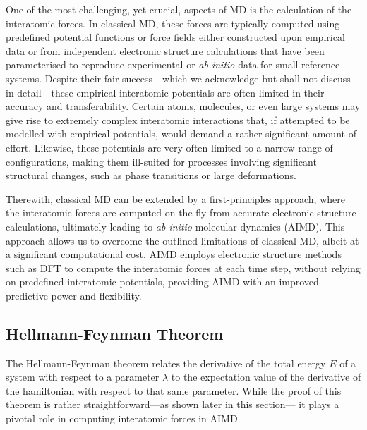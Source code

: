 One of the most challenging, yet crucial, aspects of MD is the calculation of the interatomic forces. In classical MD, these forces are typically computed using predefined potential functions or force fields either constructed upon empirical data or from independent electronic structure calculations that have been parameterised to reproduce experimental or \emph{ab initio} data for small reference systems. Despite their fair success---which we acknowledge but shall not discuss in detail---these empirical interatomic potentials are often limited in their accuracy and transferability. Certain atoms, molecules, or even large systems may give rise to extremely complex interatomic interactions that, if attempted to be modelled with empirical potentials, would demand a rather significant amount of effort. Likewise, these potentials are very often limited to a narrow range of configurations, making them ill-suited for processes involving significant structural changes, such as phase transitions or large deformations.  

Therewith, classical MD can be extended by a first-principles approach, where the interatomic forces are computed on-the-fly from accurate electronic structure calculations, ultimately leading to \emph{ab initio} molecular dynamics (AIMD). This approach allows us to overcome the outlined limitations of classical MD, albeit at a significant computational cost. AIMD employs electronic structure methods such as DFT to compute the interatomic forces at each time step, without relying on predefined interatomic potentials, providing AIMD with an improved predictive power and flexibility.  


\subsection{Hellmann-Feynman Theorem}
 The Hellmann-Feynman theorem\supercite{Feynman1939, Politzer2018} relates the derivative of the total energy $E$ of a system with respect to a parameter $\lambda$ to the expectation value of the derivative of the hamiltonian with respect to that same parameter.
 While the proof of this theorem is rather straightforward---as shown later in this section---
 it plays a pivotal role in computing interatomic forces in AIMD. 
 

